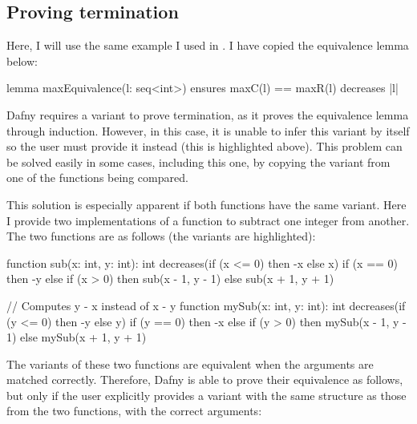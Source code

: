 \subsection{Proving termination}\label{sec:termination}

Here, I will use the same example I used in . I have copied the equivalence lemma below:
\begin{dafny}[highlightlines=3]
lemma maxEquivalence(l: seq<int>)
  ensures maxC(l) == maxR(l)
  decreases |l|
{}
\end{dafny}
%
Dafny requires a variant to prove termination, as it proves the equivalence lemma through induction. However, in this case, it is unable to infer this variant by itself so the user must provide it instead (this is highlighted above). This problem can be solved easily in some cases, including this one, by copying the variant from one of the functions being compared.

This solution is especially apparent if both functions have the same variant. Here I provide two implementations of a function to subtract one integer from another. The two functions are as follows (the variants are highlighted):
\begin{dafny}[highlightlines={2,10}]
function sub(x: int, y: int): int
  decreases(if (x <= 0) then -x else x) {
  if (x == 0) then -y
  else if (x > 0) then sub(x - 1, y - 1)
  else sub(x + 1, y + 1)
}

// Computes y - x instead of x - y
function mySub(x: int, y: int): int
  decreases(if (y <= 0) then -y else y) {
  if (y == 0) then -x
  else if (y > 0) then mySub(x - 1, y - 1)
  else mySub(x + 1, y + 1)
}
\end{dafny}
%
The variants of these two functions are equivalent when the arguments are matched correctly. Therefore, Dafny is able to prove their equivalence as follows, but only if the user explicitly provides a variant with the same structure as those from the two functions, with the correct arguments:

